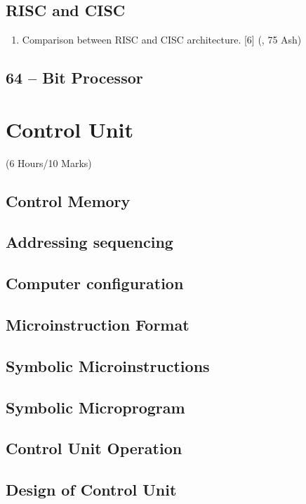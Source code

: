 \documentclass[12pt]{article}
\begin{document}
	\subsection{RISC and CISC}
	\begin{enumerate}[noitemsep, topsep = 0pt]
		\item Comparison between RISC and CISC architecture. \hfill [6] (, 75 Ash)
	\end{enumerate}
	\subsection{64 – Bit Processor}

	\pagebreak
\section{Control Unit}
	\begin{center}(6 Hours/10 Marks)\end{center} 
	\subsection{Control Memory}
	\subsection{Addressing sequencing}
	\subsection{Computer configuration}
	\subsection{Microinstruction Format}
	\subsection{Symbolic Microinstructions}
	\subsection{Symbolic Microprogram}
	\subsection{Control Unit Operation}
	\subsection{Design of Control Unit}
\end{document}
